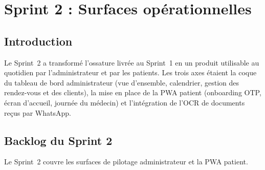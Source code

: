 \chapter{Sprint 2 : Surfaces opérationnelles}

\section{Introduction}
Le Sprint~2 a transformé l'ossature livrée au Sprint~1 en un
produit utilisable au quotidien par l'administrateur et par les
patients. Les trois axes étaient la coque du tableau de bord
administrateur (vue d'ensemble, calendrier, gestion des
rendez-vous et des clients), la mise en place de la PWA patient
(onboarding OTP, écran d'accueil, journée du médecin) et
l'intégration de l'OCR de documents reçus par WhatsApp.

\section{Backlog du Sprint 2}
Le Sprint~2 couvre les surfaces de pilotage administrateur et la
PWA patient.

